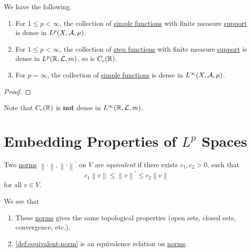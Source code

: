 \begin{proposition}
	We have the following.
	\begin{enumerate}[(1)]
		\item For \(1\leq p< \infty \), the collection of \hyperref[def:simple-function]{simple functions} with finite measure
		      \hyperref[def:support]{support} is dense in \(L^p(X, \mathcal{\MakeUppercase{a}} , \mu )\).
		\item For \(1\leq p<\infty \), the collection of \hyperref[def:step-function]{step functions} with finite measure
		      \hyperref[def:support]{support} is dense in \(L^p(\mathbb{\MakeUppercase{r}} , \mathcal{\MakeUppercase{l}} , m)\), so is \(C_c(\mathbb{\MakeUppercase{r}} )\).
		\item For \(p = \infty \), the collection of \hyperref[def:simple-function]{simple functions} is dense in \(L^{\infty} (X, \mathcal{\MakeUppercase{a}} , \mu )\).
	\end{enumerate}
\end{proposition}
\begin{proof}
\end{proof}
\begin{remark}
	Note that \(C_c(\mathbb{\MakeUppercase{r}} )\) is \textbf{not} dense in \(L^{\infty} (\mathbb{\MakeUppercase{r}} , \mathcal{\MakeUppercase{l}} , m)\).
\end{remark}

\section{Embedding Properties of \(L^p\) Spaces}
\begin{definition}\label{def:equivalent-norm}
	Two \hyperref[def:norm]{norms} \(\left\lVert \cdot\right\rVert, \left\lVert \cdot\right\rVert ^\prime  \) on \(V\) are \emph{equivalent} if there exists \(c_1, c_2>0\), such that
	\[
		c_1 \left\lVert v\right\rVert \leq \left\lVert v\right\rVert ^\prime \leq c_2 \left\lVert v\right\rVert
	\]
	for all \(v\in V\).
\end{definition}
\begin{note}
	We see that
	\begin{enumerate}[(1)]
		\item These \hyperref[def:norm]{norms} gives the same topological properties (open sets, closed sets, convergence, etc.).
		\item \autoref{def:equivalent-norm} is an equivalence relation on \hyperref[def:norm]{norms}.
	\end{enumerate}
\end{note}

